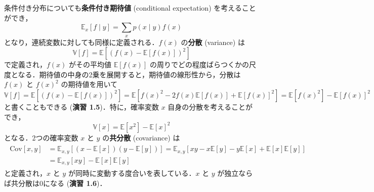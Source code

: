 \documentclass[uplatex,a4paper,oneside,openany,dvipdfmx]{jsarticle}
\numberwithin{equation}{section}
\theoremstyle{mystyle} %
\newcommand{\BE}{\mathbb{E}}
\newcommand{\BV}{\mathbb{V}}
\newcommand{\tb}[1]{\textbf{#1}}
\newcommand{\cov}[1]{\mathrm{Cov}[#1]}
\begin{document}
条件付き分布についても\tb{条件付き期待値} (conditional expectation) を考えることができ，
\begin{equation} \label{eq:1.37}
    \BE_{x}[f \mid y] = \sum_{x} p(x \mid y) f(x)
\end{equation}
となり，連続変数に対しても同様に定義される．$f(x)$ の\tb{分散} (variance) は
\begin{equation} \label{eq:1.38}
    \BV[f] = \BE\left[(f(x) - \BE[f(x)])^{2}\right]
\end{equation}
で定義され，$f(x)$ がその平均値 $\BE[f(x)]$ の周りでどの程度ばらつくかの尺度となる．期待値の中身の2乗を展開すると，期待値の線形性から，分散は $f(x)$ と $f(x)^{2}$ の期待値を用いて
\begin{equation} \label{eq:1.39}
    \BV[f] = \BE\left[(f(x) - \BE[f(x)])^{2}\right] = \BE\left[f(x)^{2} - 2 f(x) \BE[f(x)] + \BE[f(x)]^{2}\right] = \BE[f(x)^{2}] - \BE[f(x)]^{2}
\end{equation}
と書くこともできる (\tb{演習 1.5})．特に，確率変数 $x$ 自身の分散を考えることができ，
\begin{equation} \label{eq:1.40}
    \BV[x] = \BE[x^{2}] - \BE[x]^{2}
\end{equation}
となる．2つの確率変数 $x$ と $y$ の\tb{共分散} (covariance) は
\begin{align} \label{eq:1.41}
    \begin{aligned}
        \cov{x,y} &= \BE_{x,y}[(x - \BE[x])(y - \BE[y])] = \BE_{x,y}[xy - x\BE[y] -y\BE[x] + \BE[x]\BE[y]] \\
        &= \BE_{x,y}[xy] - \BE[x]\BE[y]
    \end{aligned}
\end{align}
と定義され，$x$ と $y$ が同時に変動する度合いを表している．$x$ と $y$ が独立ならば共分散は0になる (\tb{演習 1.6})．
\end{document}
